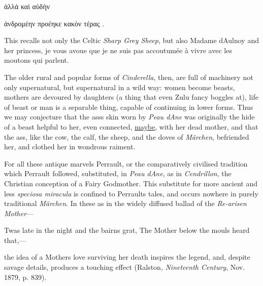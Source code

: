 \documentclass[14pt,a4paper]{memoir}
\newcommand{\ul}[1]{\uline{#1}}
\begin{document}
{ἀλλἀ καὶ αὐδὴν

ἀνδρομέην προέηκε κακὸν τέρας
.

This recalls not only the Celtic \emph{Sharp Grey Sheep}, but also
Madame d\textquotesingle Aulnoy and her princess, \textquotesingle je
vous avoue que je ne suis pas accoutumée à vivre avec les moutons qui
parlent.\textquotesingle{}

The older rural and popular forms of \emph{Cinderella}, then, are full
of machinery not only supernatural, but supernatural in a wild way:
women become beasts, mothers are devoured by daughters (a thing that
even Zulu fancy boggles at), life of beast or man is a separable thing,
capable of continuing in lower forms. Thus we may conjecture that the
ass\textquotesingle s skin worn by \emph{Peau d\textquotesingle Ane} was
originally the hide of a beast helpful to her, even connected,
\ul{maybe}, with her dead mother, and that the ass, like the cow, the
calf, the sheep, and the doves of \emph{Märchen}, befriended her, and
clothed her in wondrous raiment.

For all these antique marvels Perrault, or the comparatively civilised
tradition which Perrault followed, substituted, in \emph{Peau
d\textquotesingle Ane}, as in \emph{Cendrillon}, the Christian
conception of a Fairy Godmother. This substitute for more ancient and
less \emph{speciosa miracula} is confined to Perrault\textquotesingle s
tales, and occurs nowhere in purely traditional \emph{Märchen}. In these
as in the widely diffused ballad of the \emph{Re-arisen Mother}---

{\textquotesingle Twas late in the night and the bairns grat,} {The
Mother below the mouls heard that,---}

the idea of a Mother\textquotesingle s love surviving her death inspires
the legend, and, despite savage details, produces a touching effect
(Ralston, \emph{Nineteenth Century}, Nov. 1879, p. 839).

}
\end{document}

